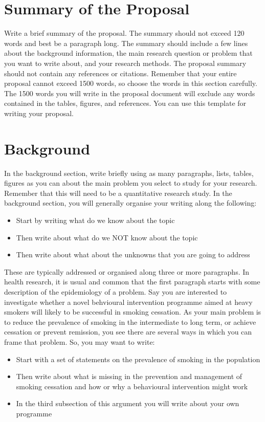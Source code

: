 \section*{Summary of the Proposal}

Write a brief summary of the proposal. The summary should not exceed 120 words and best be a paragraph long. The summary should include a few lines about the background information, the main research question or problem that you want to write about, and your research methods. The proposal summary should not contain any references or citations. Remember that your entire proposal cannot exceed 1500 words, so choose the words in this section carefully. The 1500 words you will write in the proposal document will exclude any words contained in the tables, figures, and references. You can use this template for writing your proposal. 

\section*{Background}

In the background section, write briefly using as many paragraphs, lists, tables, figures as you can about the main problem you select to study for your research. Remember that this will need to be a quantitative research study. In the background section, you will generally organise your writing along the following:

\begin{itemize}
\item Start by writing what do we know about the topic
\item Then write about what do we NOT know about the topic 
\item Then write about what about the unknowns that you are going to address
\end{itemize}

These are typically addressed or organised along three or more paragraphs. In health research, it is usual and common that the first paragraph starts with some description of the epidemiology of a problem. Say you are interested to investigate whether a novel behvioural intervention programme aimed at heavy smokers will likely to be successful in smoking cessation. As your main problem is to reduce the prevalence of smoking in the intermediate to long term, or achieve cessation or prevent remission, you see there are several ways in which you can frame that problem. So, you may want to write:

\begin{itemize}
\item Start with a set of statements on the prevalence of smoking in the population
\item Then write about what is missing in the prevention and management of smoking cessation and how or why a behavioural intervention might work
\item In the third subsection of this argument you will write about your own programme
\end{itemize}


